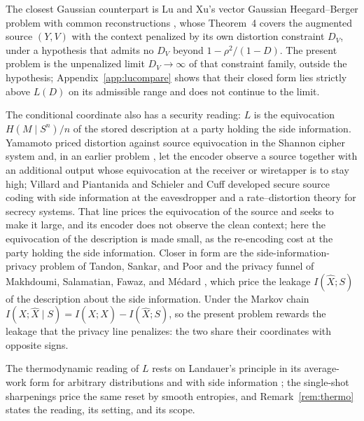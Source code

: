 \documentclass[11pt,onecolumn]{IEEEtran}
\newcommand{\hX}{\widehat{X}}
\begin{document}
The closest Gaussian counterpart is Lu and Xu's vector Gaussian
Heegard--Berger problem with common reconstructions \cite{luxu2021},
whose Theorem~4 covers the augmented source $(Y,V)$ with the context
penalized by its own distortion constraint $D_V$, under a hypothesis
that admits no $D_V$ beyond $1-\rho^2/(1-D)$. The present problem is the
unpenalized limit $D_V\to\infty$ of that constraint family, outside the
hypothesis; Appendix~\ref{app:lucompare} shows that their closed form
lies strictly above $L(D)$ on its admissible range and does not continue
to the limit.


The conditional coordinate also has a security reading: $L$ is the
equivocation $H(M\mid S^n)/n$ of the stored description at a party
holding the side information. Yamamoto priced distortion against source
equivocation in the Shannon cipher system \cite{yamamoto1997} and, in an
earlier problem \cite{yamamoto1983}, let the encoder observe a source
together with an additional output whose equivocation at the receiver
or wiretapper is to stay high; Villard and Piantanida \cite{villard2013}
and Schieler and Cuff \cite{schieler2014} developed secure source coding
with side information at the eavesdropper and a rate--distortion theory
for secrecy systems. That line prices the equivocation of the source and
seeks to make it large, and its encoder does not observe the clean
context; here the equivocation of the description is made small, as the
re-encoding cost at the party holding the side information. Closer in
form are the
side-information-privacy problem of Tandon, Sankar, and Poor
\cite{tandon2013} and the privacy funnel of Makhdoumi, Salamatian,
Fawaz, and M\'edard \cite{makhdoumi2014}, which price the leakage
$I(\hX;S)$ of the description about the side information. Under the
Markov chain $I(X;\hX\mid S)=I(X;\hX)-I(\hX;S)$, so the present problem
rewards the leakage that the privacy line penalizes: the two share
their coordinates with opposite signs.

The thermodynamic reading of $L$ rests on Landauer's principle
\cite{landauer1961} in its average-work form for arbitrary distributions
\cite{esposito2011} and with side information
\cite{sagawa2012,parrondo2015}; the single-shot sharpenings
\cite{delrio2011,faist2015} price the same reset by smooth entropies,
and Remark~\ref{rem:thermo} states the reading, its setting, and its
scope.
\end{document}
